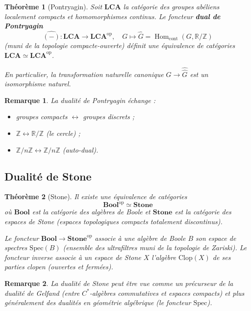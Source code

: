 \documentclass[a4paper,12pt]{book}
\DeclareMathOperator{\Hom}{Hom}
\newcommand{\op}{\mathrm{op}}
\newcommand{\Z}{\mathbb{Z}}
\newcommand{\R}{\mathbb{R}}
\newtheorem{theoreme}{Théorème}[chapter]
\newtheorem*{remarque}{Remarque}
\begin{document}
\begin{theoreme}[Pontryagin]\label{thm:pontryagin}
Soit $\mathbf{LCA}$ la catégorie des groupes abéliens localement compacts et homomorphismes continus. Le foncteur \textbf{dual de Pontryagin}
\[
  \widehat{(-)} : \mathbf{LCA} \longrightarrow \mathbf{LCA}^{\op}, \quad G \longmapsto \widehat{G} = \Hom_{\mathrm{cont}}(G, \R/\Z)
\]
(muni de la topologie compacte-ouverte) définit une équivalence de catégories $\mathbf{LCA} \simeq \mathbf{LCA}^{\op}$.

En particulier, la transformation naturelle canonique $G \to \widehat{\widehat{G}}$ est un isomorphisme naturel.
\end{theoreme}

\begin{remarque}
La dualité de Pontryagin échange :
\begin{itemize}
  \item groupes compacts $\longleftrightarrow$ groupes discrets ;
  \item $\Z \longleftrightarrow \R/\Z$ (le cercle) ;
  \item $\Z/n\Z \longleftrightarrow \Z/n\Z$ (auto-dual).
\end{itemize}
\end{remarque}

\subsection{Dualité de Stone}

\begin{theoreme}[Stone]\label{thm:stone}
Il existe une équivalence de catégories
\[
  \mathbf{Bool}^{\op} \simeq \mathbf{Stone}
\]
où $\mathbf{Bool}$ est la catégorie des algèbres de Boole et $\mathbf{Stone}$ est la catégorie des espaces de Stone (espaces topologiques compacts totalement discontinus).

Le foncteur $\mathbf{Bool} \to \mathbf{Stone}^{\op}$ associe à une algèbre de Boole $B$ son espace de spectres $\mathrm{Spec}(B)$ (ensemble des ultrafiltres muni de la topologie de Zariski). Le foncteur inverse associe à un espace de Stone $X$ l'algèbre $\mathrm{Clop}(X)$ de ses parties clopen (ouvertes et fermées).
\end{theoreme}

\begin{remarque}
La dualité de Stone peut être vue comme un précurseur de la dualité de Gelfand (entre $C^*$-algèbres commutatives et espaces compacts) et plus généralement des dualités en géométrie algébrique (le foncteur $\mathrm{Spec}$).
\end{remarque}
\end{document}
